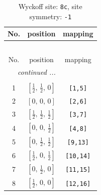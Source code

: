 \documentclass[fleqn,8pt]{jsarticle}
\begin{document}
\renewcommand{\arraystretch}{1.2}
\begin{longtable}{ccc}
\caption{Wyckoff site: {\tt 8c}, site symmetry: {\tt -1}}
 \\
 \hline \hline
No. & position & mapping \\ \hline \endfirsthead

\multicolumn{2}{l}{\tablename\ \thetable{}} \\
 \hline \hline
No. & position & mapping \\ \hline \endhead

 \hline \hline
\multicolumn{2}{r}{\footnotesize\it continued ...} \\ \endfoot

 \hline \hline
\multicolumn{2}{r}{} \\ \endlastfoot

1 & $\left[ \frac{1}{2},\, \frac{1}{2},\, 0 \right]$ & {\tt [1,5]} \\ \hline
2 & $\left[ 0,\, 0,\, 0 \right]$ & {\tt [2,6]} \\ \hline
3 & $\left[ \frac{1}{2},\, \frac{1}{2},\, \frac{1}{2} \right]$ & {\tt [3,7]} \\ \hline
4 & $\left[ 0,\, 0,\, \frac{1}{2} \right]$ & {\tt [4,8]} \\ \hline
5 & $\left[ 0,\, \frac{1}{2},\, \frac{1}{2} \right]$ & {\tt [9,13]} \\ \hline
6 & $\left[ \frac{1}{2},\, 0,\, \frac{1}{2} \right]$ & {\tt [10,14]} \\ \hline
7 & $\left[ 0,\, \frac{1}{2},\, 0 \right]$ & {\tt [11,15]} \\ \hline
8 & $\left[ \frac{1}{2},\, 0,\, 0 \right]$ & {\tt [12,16]} \\
\end{longtable}
\renewcommand{\arraystretch}{1.2}
\end{document}

